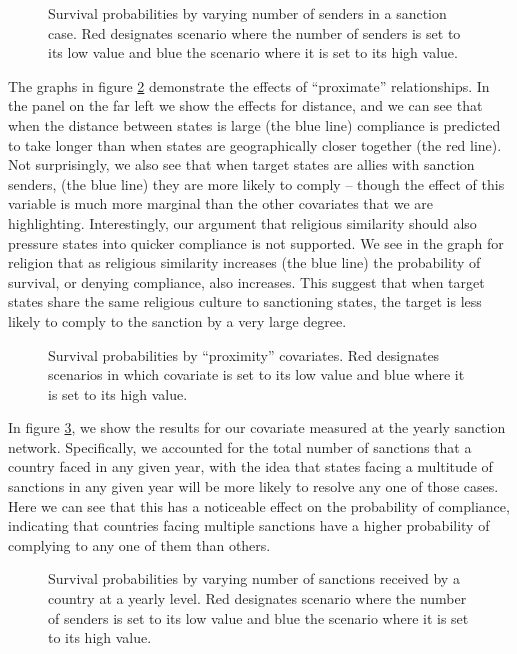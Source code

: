 \begin{figure}[ht]
	\centering
	\caption{Survival probabilities by varying number of senders in a sanction case. Red designates scenario where the number of senders is set to its low value and blue the scenario where it is set to its high value.}
	\resizebox{0.7\textwidth}{!}{}
	\label{fig:surv1}
\end{figure}
\FloatBarrier

The graphs in figure \ref{fig:surv2} demonstrate the effects of ``proximate'' relationships. In the panel on the far left we show the effects for distance, and we can see that when the distance between states is large (the blue line) compliance is predicted to take longer than when states are geographically closer together (the red line). Not surprisingly, we also see that when target states are allies with sanction senders, (the blue line) they are more likely to comply -- though the effect of this variable is much more marginal than the other covariates that we are highlighting. Interestingly, our argument that religious similarity should also pressure states into quicker compliance is not supported. We see in the graph for religion that as religious similarity increases (the blue line) the probability of survival, or denying compliance, also increases. This suggest that when target states share the same religious culture to sanctioning states, the target is less likely to comply to the sanction by a very large degree.

\begin{figure}[ht]
	\centering
	\caption{Survival probabilities by ``proximity'' covariates. Red designates scenarios in which covariate is set to its low value and blue where it is set to its high value.}
	\resizebox{1\textwidth}{!}{}	
	\label{fig:surv2}
\end{figure}
\FloatBarrier

In figure \ref{fig:surv3}, we show the results for our covariate measured at the yearly sanction network. Specifically, we accounted for the total number of sanctions that a country faced in any given year, with the idea that states facing a multitude of sanctions in any given year will be more likely to resolve any one of those cases. Here we can see that this has a noticeable effect on the probability of compliance, indicating that countries facing multiple sanctions have a higher probability of complying to any one of them than others. 

\begin{figure}[ht]
	\centering
	\caption{Survival probabilities by varying number of sanctions received by a country at a yearly level. Red designates scenario where the number of senders is set to its low value and blue the scenario where it is set to its high value.}
	\resizebox{1\textwidth}{!}{}	
	\label{fig:surv3}	
\end{figure}
\FloatBarrier